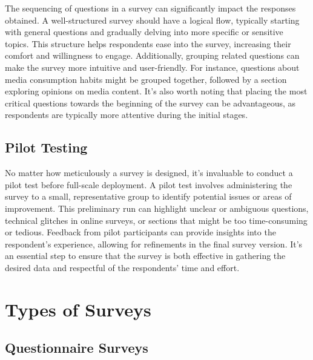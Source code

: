 \documentclass[
  b5paper]{book}
\begin{document}
The sequencing of questions in a survey can significantly impact the responses obtained. A well-structured survey should have a logical flow, typically starting with general questions and gradually delving into more specific or sensitive topics. This structure helps respondents ease into the survey, increasing their comfort and willingness to engage. Additionally, grouping related questions can make the survey more intuitive and user-friendly. For instance, questions about media consumption habits might be grouped together, followed by a section exploring opinions on media content. It's also worth noting that placing the most critical questions towards the beginning of the survey can be advantageous, as respondents are typically more attentive during the initial stages.

\hypertarget{pilot-testing-1}{%
\subsection*{Pilot Testing}\label{pilot-testing-1}}

No matter how meticulously a survey is designed, it's invaluable to conduct a pilot test before full-scale deployment. A pilot test involves administering the survey to a small, representative group to identify potential issues or areas of improvement. This preliminary run can highlight unclear or ambiguous questions, technical glitches in online surveys, or sections that might be too time-consuming or tedious. Feedback from pilot participants can provide insights into the respondent's experience, allowing for refinements in the final survey version. It's an essential step to ensure that the survey is both effective in gathering the desired data and respectful of the respondents' time and effort.

\hypertarget{types-of-surveys}{%
\section{Types of Surveys}\label{types-of-surveys}}

\hypertarget{questionnaire-surveys}{%
\subsection*{Questionnaire Surveys}\label{questionnaire-surveys}}
\end{document}
